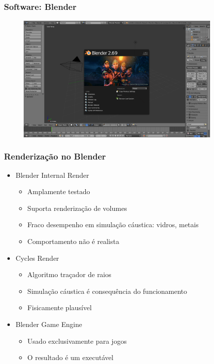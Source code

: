 \documentclass{beamer}
\begin{document}
\subsection{}
\begin{frame}

\frametitle{Software: Blender}

\begin{figure}[!htb]
\center
\includegraphics[width=10cm]{blender_gui}
\end{figure}


\end{frame}
\begin{frame}

\frametitle{Renderização no Blender}
\begin{itemize}
\item Blender Internal Render
    \begin{itemize}
        \item Amplamente testado
        \item Suporta renderização de volumes
        \item Fraco desempenho em simulação cáustica: vidros, metais
        \item Comportamento não é realista
    \end{itemize}
\item Cycles Render
    \begin{itemize}
        \item Algoritmo traçador de raios
        \item Simulação cáustica é consequência do funcionamento
        \item Fisicamente plausível
    \end{itemize}
\item Blender Game Engine
\begin{itemize}
    \item Usado exclusivamente para jogos
    \item O resultado é um executável
 \end{itemize}
\end{itemize}

\end{frame}
\end{document}
